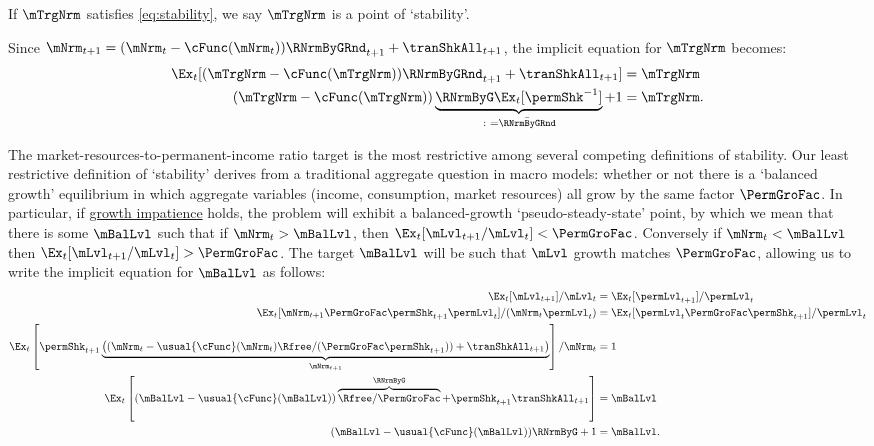 \documentclass[BufferStockTheory]{subfiles}
\begin{document}
If $\mTrgNrm$ satisfies \eqref{eq:stability}, we say $\mTrgNrm$ is a point of `stability'.

\hypertarget{mTargImplicit}{}
Since $\mNrm_{t+1}= (\mNrm_{t}-\cFunc(\mNrm_{t}))\RNrmByGRnd_{t+1}  +\tranShkAll_{t+1}$, the implicit equation for $\mTrgNrm$ becomes:
%
\begin{equation} \label{eq:mTargImplicit}
  \begin{split}
    \Ex_{t} [(\mTrgNrm-\cFunc(\mTrgNrm))\RNrmByGRnd_{t+1}+\tranShkAll_{t+1}] & = \mTrgNrm     \\   (\mTrgNrm-\cFunc(\mTrgNrm))\underbrace{\RNrmByG\Ex_{t}[\permShk^{-1}]}_{\colon = \bar{\RNrmByGRnd}}+1 & = \mTrgNrm .
  \end{split}
\end{equation}

\hypertarget{Collective-Stability}{}
\hypertarget{pseudo-steady-state}{}

The market-resources-to-permanent-income ratio target is the most restrictive among several competing definitions of stability.
Our least restrictive definition of `stability' derives from a traditional aggregate question in macro models: whether or not there is a `balanced growth' equilibrium in which aggregate variables (income, consumption, market resources) all grow by the same factor $\PermGroFac$.
In particular, if \hyperlink{GIC}{growth impatience} holds, the problem will exhibit a balanced-growth `pseudo-steady-state' point, by which we mean that there is some ${\mBalLvl}$ such that if $\mNrm_{t}>{\mBalLvl}$, then $\Ex_{t}[\mLvl_{t+1}/\mLvl_{t}] < \PermGroFac$.\hypertarget{balgrostable}{}
\hypertarget{balgrostableSolve}{}
Conversely if $\mNrm_{t}<{\mBalLvl}$ then $\Ex_{t}[\mLvl_{t+1}/\mLvl_{t}] > \PermGroFac$.
The target $\mBalLvl$ will be such that $\mLvl$ growth matches $\PermGroFac$, allowing us to write the implicit equation for $\mBalLvl$ as follows:
%
\begin{equation}\label{eq:balgrostable}
  \begin{split}
    \Ex_{t}[\mLvl_{t+1}]/\mLvl_{t} & =\Ex_{t}[\permLvl_{t+1}]/\permLvl_{t}
    \\  \Ex_{t}[\mNrm_{t+1}\PermGroFac\permShk_{t+1}\permLvl_{t}]/(\mNrm_{t}\permLvl_{t}) & =\Ex_{t}[\permLvl_{t}\PermGroFac\permShk_{t+1}]/\permLvl_{t}
    \\ \Ex_{t}\left[\permShk_{t+1}\underbrace{\left((\mNrm_{t}-\usual{\cFunc}(\mNrm_{t})\Rfree/(\PermGroFac\permShk_{t+1}))+\tranShkAll_{t+1}\right)}_{\mNrm_{t+1}}\right]/\mNrm_{t} & = 1
    \\ 
    \Ex_{t}\left[(\mBalLvl-\usual{\cFunc}(\mBalLvl))\overbrace{\Rfree/\PermGroFac}^{\RNrmByG}+\permShk_{t+1}\tranShkAll_{t+1}\right] & = \mBalLvl
    \\  (\mBalLvl-\usual{\cFunc}(\mBalLvl))\RNrmByG + 1 & = \mBalLvl .
  \end{split}
\end{equation}
\end{document}
